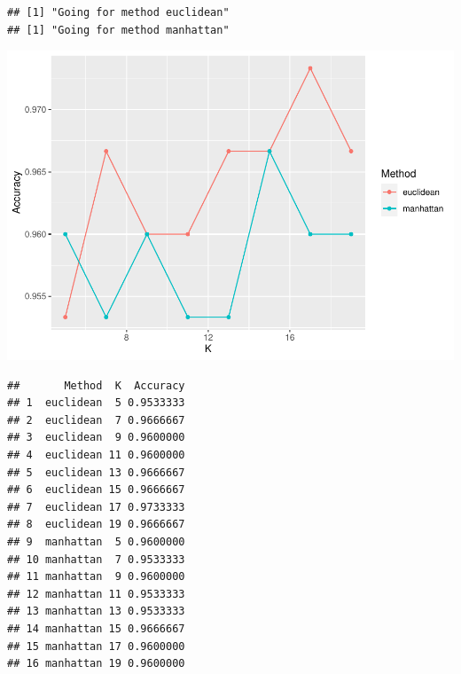 \documentclass[a4paper,conference]{IEEEtran}
\newenvironment{Shaded}{\begin{snugshade}}{\end{snugshade}}
\newcommand{\AttributeTok}[1]{\textcolor[rgb]{0.13,0.29,0.53}{#1}}
\newcommand{\DecValTok}[1]{\textcolor[rgb]{0.00,0.00,0.81}{#1}}
\newcommand{\FunctionTok}[1]{\textcolor[rgb]{0.13,0.29,0.53}{\textbf{#1}}}
\newcommand{\NormalTok}[1]{#1}
\newcommand{\OtherTok}[1]{\textcolor[rgb]{0.56,0.35,0.01}{#1}}
\newcommand{\SpecialCharTok}[1]{\textcolor[rgb]{0.81,0.36,0.00}{\textbf{#1}}}
\newcommand{\StringTok}[1]{\textcolor[rgb]{0.31,0.60,0.02}{#1}}
\begin{document}
\begin{Shaded}
\end{Shaded}

\begin{verbatim}
## [1] "Going for method euclidean"
## [1] "Going for method manhattan"
\end{verbatim}

\includegraphics{figure/unnamed-chunk-11-1.pdf}

\begin{verbatim}
##       Method  K  Accuracy
## 1  euclidean  5 0.9533333
## 2  euclidean  7 0.9666667
## 3  euclidean  9 0.9600000
## 4  euclidean 11 0.9600000
## 5  euclidean 13 0.9666667
## 6  euclidean 15 0.9666667
## 7  euclidean 17 0.9733333
## 8  euclidean 19 0.9666667
## 9  manhattan  5 0.9600000
## 10 manhattan  7 0.9533333
## 11 manhattan  9 0.9600000
## 12 manhattan 11 0.9533333
## 13 manhattan 13 0.9533333
## 14 manhattan 15 0.9666667
## 15 manhattan 17 0.9600000
## 16 manhattan 19 0.9600000
\end{verbatim}
\end{document}

